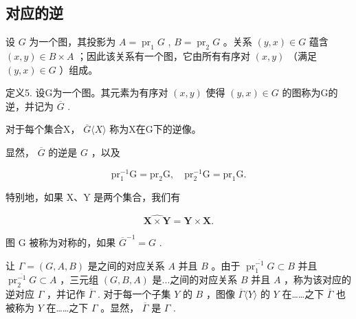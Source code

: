 \subsection{对应的逆}

设 \(G\) 为一个图，其投影为 \(A = \operatorname{pr}_1 G\) , \(B = \operatorname{pr}_2 G\) 。关系 \((y, x) \in G\) 蕴含 \((x, y) \in B \times A\) ；因此该关系有一个图，它由所有有序对 \((x, y)\) （满足 \((y, x) \in G\) ）组成。

定义5. 设G为一个图。其元素为有序对 \((x, y)\) 使得 \((y, x) \in G\) 的图称为G的逆，并记为 \(\overline{G}\) .

对于每个集合X， \(\overline{G}\langle X\rangle\) 称为X在G下的逆像。

显然， \(\overline{G}\) 的逆是 \(G\) ，以及

\[
\mathrm{pr} _ {1} ^ {- 1} \mathrm{G} = \mathrm{pr} _ {2} \mathrm{G}, \quad \mathrm{pr} _ {2} ^ {- 1} \mathrm{G} = \mathrm{pr} _ {1} \mathrm{G}.
\]

特别地，如果 X、Y 是两个集合，我们有

\[
\widehat {\mathbf {X} \times \mathbf {Y}} = \mathbf {Y} \times \mathbf {X}.
\]

图 G 被称为对称的，如果 \(\overline{G}^{-1}=G\) .

让 \(\Gamma = (G, A, B)\) 是之间的对应关系 \(A\) 并且 \(B\) 。由于 \(\operatorname{pr}_1^{\overline{-1}} G \subset B\) 并且 \(\operatorname{pr}_2^{\overline{-1}} G \subset A\) ，三元组 \((G, B, A)\) 是...之间的对应关系 \(B\) 并且 \(A\) ，称为该对应的逆对应 \(\Gamma\) ，并记作 \(\overline{\Gamma}\) . 对于每一个子集 \(Y\) 的 \(B\) ，图像 \(\overline{\Gamma} \langle Y \rangle\) 的 \(Y\) 在……之下 \(\overline{\Gamma}\) 也被称为 \(Y\) 在……之下 \(\Gamma\) 。显然， \(\overline{\Gamma}\) 是 \(\Gamma\) .

